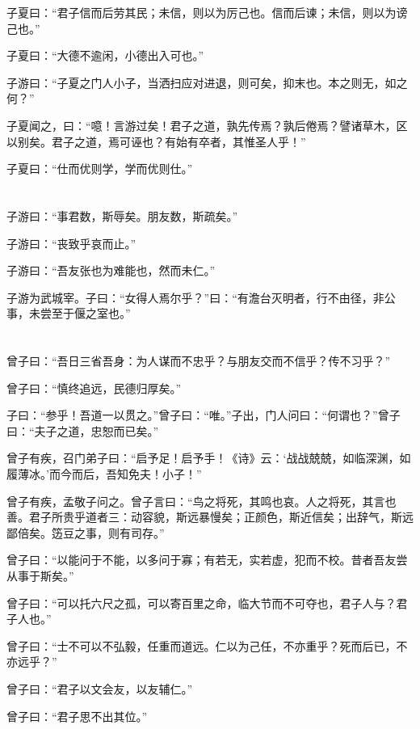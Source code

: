 \documentclass[a5paper]{ctexbook}
\begin{document}
    子夏曰：“君子信而后劳其民；未信，则以为厉己也。信而后谏；未信，则以为谤己也。” 
    
    子夏曰：“大德不逾闲，小德出入可也。” 
    
    子游曰：“子夏之门人小子，当洒扫应对进退，则可矣，抑末也。本之则无，如之何？”
    
    子夏闻之，曰：“噫！言游过矣！君子之道，孰先传焉？孰后倦焉？譬诸草木，区以别矣。君子之道，焉可诬也？有始有卒者，其惟圣人乎！”

    子夏曰：“仕而优则学，学而优则仕。”

    \chapter{}

    子游曰：“事君数，斯辱矣。朋友数，斯疏矣。”

    子游曰：“丧致乎哀而止。” 
    
    子游曰：“吾友张也为难能也，然而未仁。”

    子游为武城宰。子曰：“女得人焉尔乎？”曰：“有澹台灭明者，行不由径，非公事，未尝至于偃之室也。”

    \chapter{}

    曾子曰：“吾日三省吾身：为人谋而不忠乎？与朋友交而不信乎？传不习乎？”

    曾子曰：“慎终追远，民德归厚矣。”

    子曰：“参乎！吾道一以贯之。”曾子曰：“唯。”子出，门人问曰：“何谓也？”曾子曰：“夫子之道，忠恕而已矣。”

    曾子有疾，召门弟子曰：“启予足！启予手！《诗》云：‘战战兢兢，如临深渊，如履薄冰。’而今而后，吾知免夫！小子！”

    曾子有疾，孟敬子问之。曾子言曰：“鸟之将死，其鸣也哀。人之将死，其言也善。君子所贵乎道者三：动容貌，斯远暴慢矣；正颜色，斯近信矣；出辞气，斯远鄙倍矣。笾豆之事，则有司存。”

    曾子曰：“以能问于不能，以多问于寡；有若无，实若虚，犯而不校。昔者吾友尝从事于斯矣。” 
    
    曾子曰：“可以托六尺之孤，可以寄百里之命，临大节而不可夺也，君子人与？君子人也。”  
    
    曾子曰：“士不可以不弘毅，任重而道远。仁以为己任，不亦重乎？死而后已，不亦远乎？”

    曾子曰：“君子以文会友，以友辅仁。” 
    
    曾子曰：“君子思不出其位。”
\end{document}
